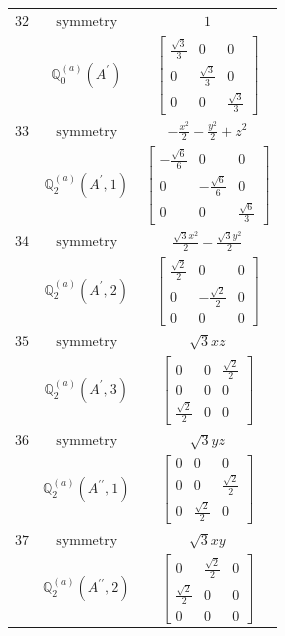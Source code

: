 \documentclass[fleqn,8pt,landscape]{jsarticle}
\begin{document}
\begin{longtable}{ccc}
$ 32 $ & $ \text{symmetry} $ & $ 1 $ \\
$  $ & $ \mathbb{Q}_{0}^{(a)}(A^{\prime}) $ & $ \begin{bmatrix} \frac{\sqrt{3}}{3} & 0 & 0 \\ 0 & \frac{\sqrt{3}}{3} & 0 \\ 0 & 0 & \frac{\sqrt{3}}{3} \end{bmatrix} $ \\ \hline
$ 33 $ & $ \text{symmetry} $ & $ - \frac{x^{2}}{2} - \frac{y^{2}}{2} + z^{2} $ \\
$  $ & $ \mathbb{Q}_{2}^{(a)}(A^{\prime},1) $ & $ \begin{bmatrix} - \frac{\sqrt{6}}{6} & 0 & 0 \\ 0 & - \frac{\sqrt{6}}{6} & 0 \\ 0 & 0 & \frac{\sqrt{6}}{3} \end{bmatrix} $ \\ \hline
$ 34 $ & $ \text{symmetry} $ & $ \frac{\sqrt{3} x^{2}}{2} - \frac{\sqrt{3} y^{2}}{2} $ \\
$  $ & $ \mathbb{Q}_{2}^{(a)}(A^{\prime},2) $ & $ \begin{bmatrix} \frac{\sqrt{2}}{2} & 0 & 0 \\ 0 & - \frac{\sqrt{2}}{2} & 0 \\ 0 & 0 & 0 \end{bmatrix} $ \\ \hline
$ 35 $ & $ \text{symmetry} $ & $ \sqrt{3} x z $ \\
$  $ & $ \mathbb{Q}_{2}^{(a)}(A^{\prime},3) $ & $ \begin{bmatrix} 0 & 0 & \frac{\sqrt{2}}{2} \\ 0 & 0 & 0 \\ \frac{\sqrt{2}}{2} & 0 & 0 \end{bmatrix} $ \\ \hline
$ 36 $ & $ \text{symmetry} $ & $ \sqrt{3} y z $ \\
$  $ & $ \mathbb{Q}_{2}^{(a)}(A^{\prime\prime},1) $ & $ \begin{bmatrix} 0 & 0 & 0 \\ 0 & 0 & \frac{\sqrt{2}}{2} \\ 0 & \frac{\sqrt{2}}{2} & 0 \end{bmatrix} $ \\ \hline
$ 37 $ & $ \text{symmetry} $ & $ \sqrt{3} x y $ \\
$  $ & $ \mathbb{Q}_{2}^{(a)}(A^{\prime\prime},2) $ & $ \begin{bmatrix} 0 & \frac{\sqrt{2}}{2} & 0 \\ \frac{\sqrt{2}}{2} & 0 & 0 \\ 0 & 0 & 0 \end{bmatrix} $ \\ \hline

\end{longtable}
\end{document}
